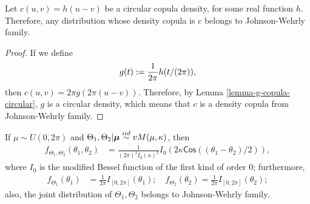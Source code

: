 \documentclass[oneside,11pt]{article}
\begin{document}
\begin{corollary}\label{cor-g-copula}
    Let $c(u,v) = h(u-v)$ be a circular copula density, for some real function $h$. Therefore, any distribution whose density copula is $c$ belongs to Johnson-Wehrly family.
\end{corollary}
\begin{proof}
    If we define
    \begin{align*}
        g(t) := \frac{1}{2 \pi} h(t/(2\pi)),
    \end{align*}
    then $c(u,v) = 2 \pi g(2 \pi (u-v))$. Therefore, by Lemma \ref{lemma-g-copula-circular}, $g$ is a circular density, which means that $c$ is a density copula from Johnson-Wehrly family.
\end{proof}

\begin{proposition}\label{prop-js-family}
    If $\mu \sim U(0, 2\pi)$ and $\Theta_1, \Theta_2 | \boldsymbol\mu \stackrel {iid}\sim vM(\mu,\kappa)$, then
    \begin{align*}
        f_{\Theta_1, \Theta_2}(\theta_1, \theta_2) &= \frac{1}{(2 \pi)^2 I_0(\kappa)^2} I_0(2 \kappa \mathsf{Cos}((\theta_1 - \theta_2)/2)),
    \end{align*}
    where $I_0$ is the modified Bessel function of the first kind of order 0; furthermore,
    \begin{align*}
        f_{\Theta_1}(\theta_1) &= \frac{1}{2 \pi} I_{[0,2\pi]}(\theta_1);\quad 
        f_{\Theta_2}(\theta_2) = \frac{1}{2 \pi} I_{[0,2\pi]}(\theta_2); 
    \end{align*}
    also, the joint distribution of $\Theta_1, \Theta_2$ belongs to Johnson-Wehrly family.
\end{proposition}
\end{document}
